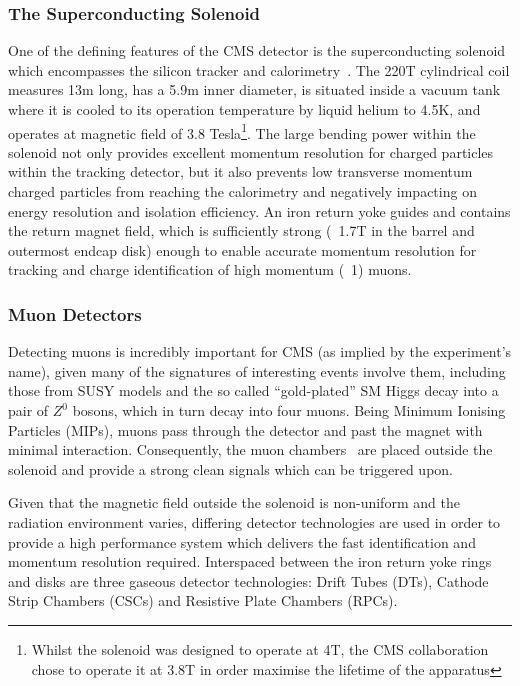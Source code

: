 \subsubsection{The Superconducting Solenoid}\label{subsubsec:magnet}
One of the defining features of the CMS detector is the superconducting solenoid which encompasses the silicon tracker and calorimetry~\cite{Acquistapace:1997fm,Herve:2000}.
The 220T cylindrical coil measures 13m long, has a 5.9m inner diameter, is situated inside a vacuum tank where it is cooled to its operation temperature by liquid helium to 4.5K, and operates at magnetic field of 3.8 Tesla\footnote{Whilst the solenoid was designed to operate at 4T, the CMS collaboration chose to operate it at 3.8T in order maximise the lifetime of the apparatus}.
The large bending power within the solenoid not only provides excellent momentum resolution for charged particles within the tracking detector, but it also prevents low transverse momentum charged particles from reaching the calorimetry and negatively impacting on energy resolution and isolation efficiency.
An iron return yoke guides and contains the return magnet field, which is sufficiently strong (~1.7T in the barrel and outermost endcap disk) enough to enable accurate momentum resolution for tracking and charge identification of high momentum (~1\TeVc) muons.

\subsubsection{Muon Detectors}\label{subsubsec:muon chambers}
Detecting muons is incredibly important for CMS (as implied by the experiment’s name), given many of the signatures of interesting events involve them, including those from SUSY models and the so called “gold-plated” SM Higgs decay into a pair of $Z^{0}$ bosons, which in turn decay into four muons. 
Being Minimum Ionising Particles (MIPs), muons pass through the detector and past the magnet with minimal interaction.
Consequently, the muon chambers~\cite{CMS:1997iti} are placed outside the solenoid and provide a strong clean signals which can be triggered upon.

Given that the magnetic field outside the solenoid is non-uniform and the radiation environment varies, differing detector technologies are used in order to provide a high performance system which delivers the fast identification and momentum resolution required. 
Interspaced between the iron return yoke rings and disks are three gaseous detector technologies: Drift Tubes (DTs), Cathode Strip Chambers (CSCs) and Resistive Plate Chambers (RPCs).

